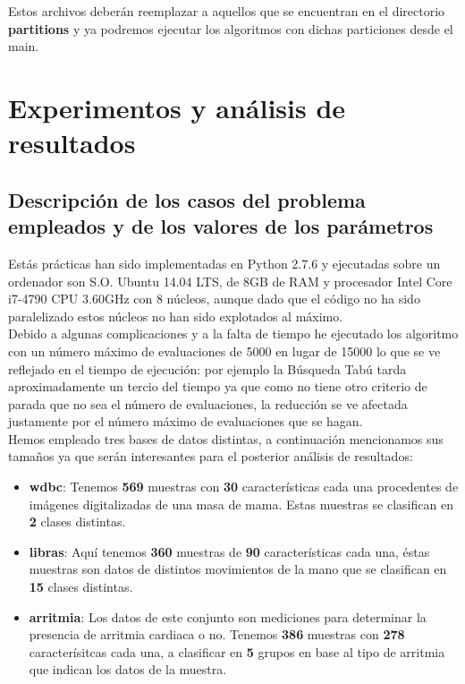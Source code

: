 \documentclass[10pt,a4paper]{article}
\begin{document}
Estos archivos deberán reemplazar a aquellos que se encuentran en el directorio \textbf{partitions} y ya podremos ejecutar los algoritmos con dichas particiones desde el main.\\

\newpage
\section{\color[rgb]{0.0,0.0,0.21}Experimentos y análisis de resultados}

\subsection{\color[rgb]{0.0,0.0,0.51}Descripción de los casos del problema empleados y de los valores de los parámetros}


Estás prácticas han sido implementadas en Python 2.7.6 y ejecutadas sobre un ordenador son S.O. Ubuntu 14.04 LTS, de 8GB de RAM y procesador Intel Core i7-4790 CPU 3.60GHz con 8 núcleos, aunque dado que el código no ha sido paralelizado estos núcleos no han sido explotados al máximo.\\

Debido a algunas complicaciones y a la falta de tiempo he ejecutado los algoritmo con un número máximo de evaluaciones de 5000 en lugar de 15000 lo que se ve reflejado en el tiempo de ejecución: por ejemplo la Búsqueda Tabú tarda aproximadamente un tercio del tiempo ya que como no tiene otro criterio de parada que no sea el número de evaluaciones, la reducción se ve afectada justamente por el número máximo de evaluaciones que se hagan.\\

Hemos empleado tres bases de datos distintas, a continuación mencionamos sus tamaños ya que serán interesantes para el posterior análisis de resultados:\\

\begin{itemize}
\item \textbf{wdbc}: Tenemos \textbf{569} muestras con \textbf{30} características cada una procedentes de imágenes digitalizadas de una masa de mama. Estas muestras se clasifican en \textbf{2} clases distintas.
\item \textbf{libras}: Aquí tenemos \textbf{360} muestras de \textbf{90} características cada una, éstas muestras son datos de distintos movimientos de la mano que se clasifican en \textbf{15} clases distintas.
\item \textbf{arritmia}: Los datos de este conjunto son mediciones para determinar la presencia de arritmia cardiaca o no. Tenemos \textbf{386} muestras con \textbf{278} caracterísitcas cada una, a clasificar en \textbf{5} grupos en base al tipo de arritmia que indican los datos de la muestra.
\end{itemize}
\end{document}
